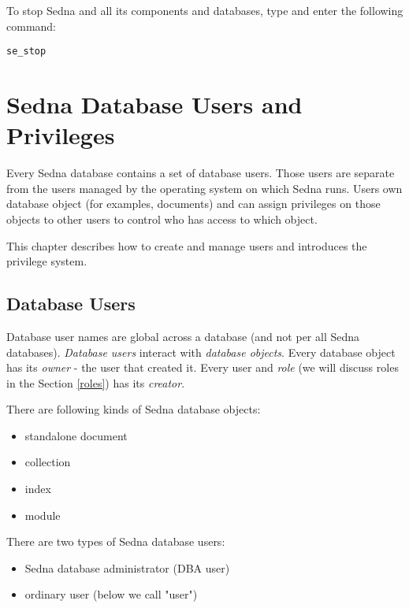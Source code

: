 \documentclass[a4paper,12pt]{article}
\begin{document}
To stop Sedna and all its components and databases, type and enter the following command:

\begin{verbatim}
se_stop
\end{verbatim}



%
%
%
%
\section{Sedna Database Users and Privileges}

Every Sedna database contains a set of database users. Those users are separate from the users managed by the operating system on which Sedna runs. Users own database object (for examples, documents) and can assign privileges on those objects to other users to control who has access to which object. 

This chapter describes how to create and manage users and introduces the privilege system.

\subsection{Database Users}

Database user names are global across a database (and not per all Sedna databases). \emph{Database users} interact with \emph{database objects}. Every database object has its \emph{owner} - the user that created it. Every user and \emph{role} (we will discuss roles in the Section \ref{roles}) has its \emph{creator}.

There are following kinds of Sedna database objects:
\begin{itemize}
\item standalone document
\item collection
\item index
\item module
\end{itemize}

There are two types of Sedna database users:

\begin{itemize}
\item Sedna database administrator (DBA user)
\item ordinary user (below we call "user")
\end{itemize}
\end{document}
